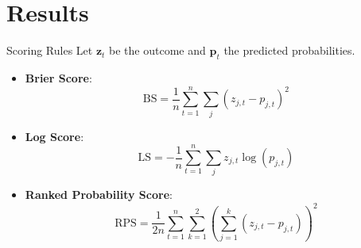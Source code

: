 \documentclass{beamer}
\makeatletter
\newlength{\my@beamer@itemsepi}\setlength{\my@beamer@itemsepi}{3ex}
\newlength{\my@beamer@itemsepii}\setlength{\my@beamer@itemsepii}{1.5ex}
\newlength{\my@beamer@itemsepiii}\setlength{\my@beamer@itemsepiii}{1.5ex}
\newcommand\setlistsep[3]{%
    \setlength{\my@beamer@itemsepi}{#1}%
    \setlength{\my@beamer@itemsepii}{#2}%
    \setlength{\my@beamer@itemsepiii}{#3}%
}
\makeatother
\begin{document}
\section{Results}

\begin{frame}{Scoring Rules}
    Let $\mathbf{z}_t$ be the outcome and $\mathbf{p}_t$ the predicted probabilities.

    \setlistsep{1.2ex}{1ex}{1ex}
    \begin{itemize}
        \item \textbf{Brier Score}:
        \[\text{BS} = \frac{1}{n} \sum_{t=1}^{n} \sum_{j} (z_{j,t} - p_{j,t})^2\]

        \item \textbf{Log Score}:
        \[\text{LS} = -\frac{1}{n} \sum_{t=1}^{n} \sum_{j} z_{j,t} \log(p_{j,t})\]

        \item \textbf{Ranked Probability Score}:
        \[\text{RPS} = \frac{1}{2n} \sum_{t=1}^{n} \sum_{k=1}^{2} \!\left( \sum_{j=1}^{k} (z_{j,t} - p_{j,t}) \right)^{\!2}\]
    \end{itemize}
\end{frame}
\end{document}
